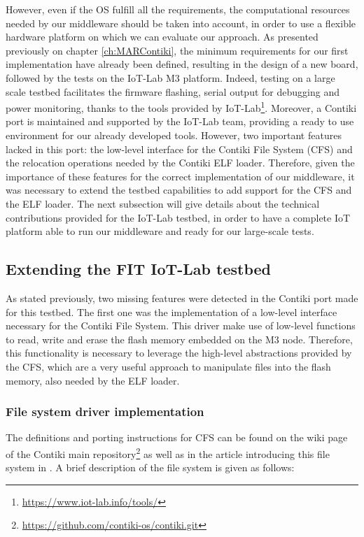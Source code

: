 However, even if the OS fulfill all the requirements, the computational resources needed by our middleware should be taken into account, in order to use a flexible hardware platform on which we can evaluate our approach.
As presented previously on chapter \ref{ch:MARContiki}, the minimum requirements for our first implementation have already been defined, resulting in the design of a new board, followed by the tests on the IoT-Lab M3 platform.
Indeed, testing on a large scale testbed facilitates the firmware flashing, serial output for debugging and power monitoring, thanks to the tools provided by IoT-Lab\footnote{\url{https://www.iot-lab.info/tools/}}.
Moreover, a Contiki port is maintained and supported by the IoT-Lab team, providing a ready to use environment for our already developed tools.
However, two important features lacked in this port: the low-level interface for the Contiki File System (CFS) and the relocation operations needed by the Contiki ELF loader.
Therefore, given the importance of these features for the correct implementation of our middleware, it was necessary to extend the testbed capabilities to add support for the CFS and the ELF loader.
The next subsection will give details about the technical contributions provided for the IoT-Lab testbed, in order to have a complete IoT platform able to run our middleware and ready for our large-scale tests.

\subsection{Extending the FIT IoT-Lab testbed}
As stated previously, two missing features were detected in the Contiki port made for this testbed.
The first one was the implementation of a low-level interface necessary for the Contiki File System.
This driver make use of low-level functions to read, write and erase the flash memory embedded on the M3 node.
Therefore, this functionality is necessary to leverage the high-level abstractions provided by the CFS, which are a very useful approach to manipulate files into the flash memory, also needed by the ELF loader.


\subsubsection{File system driver implementation}
The definitions and porting instructions for CFS can be found on the wiki page of the Contiki main repository\footnote{\url{https://github.com/contiki-os/contiki.git}} as well as in the article introducing this file system in \cite{tsiftes09enabling}.
A brief description of the file system is given as follows:

